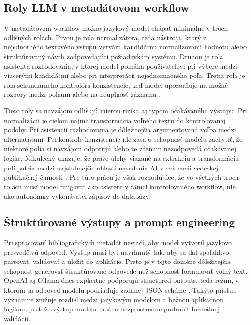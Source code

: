 \subsection{Roly LLM v metadátovom workflow}

V metadátovom workflow možno jazykový model chápať minimálne v troch odlišných rolách. Prvou je rola normalizátora, teda nástroja, ktorý z nejednotného textového vstupu vytvára kandidátnu normalizovanú hodnotu alebo štruktúrovaný návrh zodpovedajúci požiadavkám systému. Druhou je rola asistenta rozhodovania, v ktorej model pomáha používateľovi pri výbere medzi viacerými kandidátmi alebo pri interpretácii nejednoznačného poľa. Tretia rola je rola sekundárneho kontrolóra konzistencie, keď model upozorňuje na možné rozpory medzi poliami alebo na neúplnosť záznamu \cite{Mikulecky2025}.

Tieto roly sa navzájom odlišujú mierou rizika aj typom očakávaného výstupu. Pri normalizácii je cieľom najmä transformácia voľného textu do kontrolovanej podoby. Pri asistencii rozhodovania je dôležitejšia argumentovaná voľba medzi alternatívami. Pri kontrole konzistencie ide zasa o schopnosť modelu zachytiť, že niektoré polia si navzájom odporujú alebo že záznam nezodpovedá očakávanej logike. Mikulecký ukazuje, že práve úlohy viazané na extrakciu a transformáciu polí patria medzi najsľubnejšie oblasti nasadenia AI v evidencii vedeckej publikačnej činnosti \cite{Mikulecky2025}. Pre túto prácu je však rozhodujúce, že vo všetkých troch rolách musí model fungovať ako asistent v rámci kontrolovaného workflow, nie ako autonómny vykonávateľ zápisov do databázy.

\subsection{Štruktúrované výstupy a prompt engineering}

Pri spracovaní bibliografických metadát nestačí, aby model vytvoril jazykovo presvedčivú odpoveď. Výstup musí byť navrhnutý tak, aby sa dal spoľahlivo parsovať, validovať a uložiť do aplikácie. Preto je v tejto doméne dôležitejšia schopnosť generovať štruktúrované odpovede než schopnosť formulovať voľný text. OpenAI aj Ollama dnes explicitne podporujú structured outputs, teda režim, v ktorom sa odpoveď modelu podriaďuje zadanej JSON schéme \cite{OpenAIStructuredOutputs,OllamaStructuredOutputs}. Takýto prístup významne znižuje rozdiel medzi jazykovým modelom a bežnou aplikačnou logikou, pretože výstup modelu možno bezprostredne podrobiť formálnej validácii.

